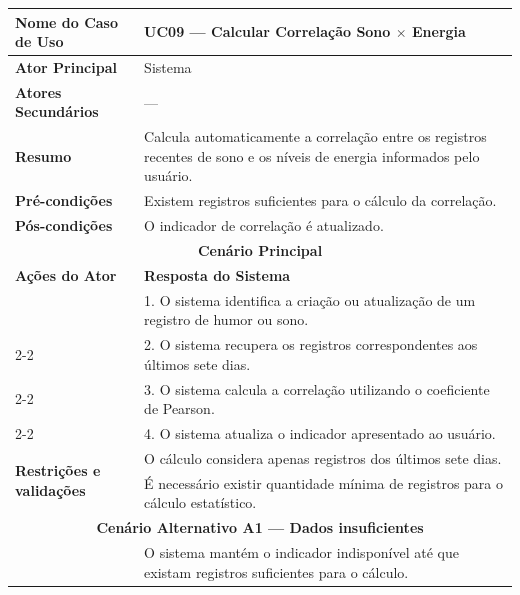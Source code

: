 
\begin{longtable}{| p{} | p{} |}
\hline

\textbf{Nome do Caso de Uso} &
UC09 --- Calcular Correlação Sono $\times$ Energia \\
\hline

\textbf{Ator Principal} &
Sistema \\
\hline

\textbf{Atores Secundários} &
--- \\
\hline

\textbf{Resumo} &
Calcula automaticamente a correlação entre os registros recentes de sono e os níveis de energia informados pelo usuário. \\
\hline

\textbf{Pré-condições} &
Existem registros suficientes para o cálculo da correlação. \\
\hline

\textbf{Pós-condições} &
O indicador de correlação é atualizado. \\
\hline

\multicolumn{2}{|c|}{\textbf{Cenário Principal}}\\
\hline

\textbf{Ações do Ator} &
\textbf{Resposta do Sistema} \\
\hline

&
1. O sistema identifica a criação ou atualização de um registro de humor ou sono. \\
\cline{2-2}

&
2. O sistema recupera os registros correspondentes aos últimos sete dias. \\
\cline{2-2}

&
3. O sistema calcula a correlação utilizando o coeficiente de Pearson. \\
\cline{2-2}

&
4. O sistema atualiza o indicador apresentado ao usuário. \\
\hline

\multirow{2}{.40\textwidth}{\textbf{Restrições e validações}}
&
O cálculo considera apenas registros dos últimos sete dias. \\
\cline{2-2}

&
É necessário existir quantidade mínima de registros para o cálculo estatístico. \\
\hline

\multicolumn{2}{|c|}{\textbf{Cenário Alternativo A1 --- Dados insuficientes}}\\
\hline

&
O sistema mantém o indicador indisponível até que existam registros suficientes para o cálculo. \\
\hline

\end{longtable}
